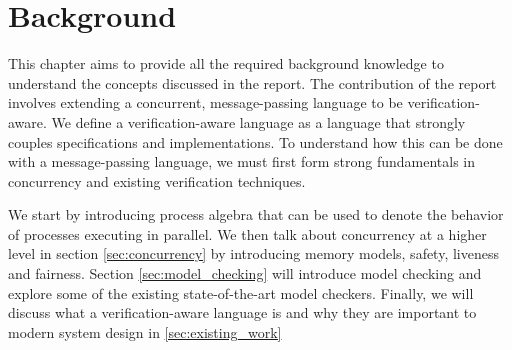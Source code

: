 \chapter{Background}
This chapter aims to provide all the required background knowledge to understand the concepts discussed in the report. The contribution of the report involves extending a concurrent, message-passing language to be verification-aware. We define a verification-aware language as a language that strongly couples specifications and implementations. To understand how this can be done with a message-passing language, we must first form strong fundamentals in concurrency and existing verification techniques.
\par
We start by introducing process algebra that can be used to denote the behavior of processes executing in parallel. We then talk about concurrency at a higher level in section \ref{sec:concurrency} by introducing memory models, safety, liveness and fairness. Section \ref{sec:model_checking} will introduce model checking and explore some of the existing state-of-the-art model checkers. Finally, we will discuss what a verification-aware language is and why they are important to modern system design in \ref{sec:existing_work}

